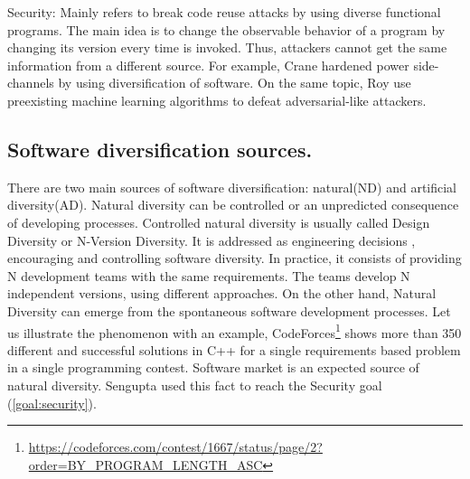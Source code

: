 \begin{goal}{Security:}
    \label{goal:security}    
    \normalfont
    Mainly refers to break code reuse attacks \cite{595185} by using diverse functional programs. The main idea is to change the observable behavior of a program by changing its version every time is invoked. Thus, attackers cannot get the same information from a different source. For example, Crane \etal \cite{crane2015thwarting} hardened power side-channels by using diversification of software. On the same topic, Roy \etal \cite{10.1145/3318216.3363338} use preexisting machine learning algorithms to defeat adversarial-like attackers.
\end{goal} 







\subsection*{Software diversification sources.}

There are two main sources of software diversification: natural(ND) and artificial diversity(AD). Natural diversity can be controlled or an unpredicted consequence of developing processes. Controlled natural diversity is usually called Design Diversity or N-Version Diversity. It is addressed as engineering decisions \cite{1659219}, encouraging and controlling software diversity. In practice, it consists of providing N development teams with the same requirements. The teams develop N independent versions, using different approaches. On the other hand, Natural Diversity can emerge from the spontaneous software development processes. Let us illustrate the phenomenon with an example, CodeForces\footnote{\url{https://codeforces.com/contest/1667/status/page/2?order=BY_PROGRAM_LENGTH_ASC}} shows more than 350 different and successful solutions in C++ for a single requirements based problem in a single programming contest. 
Software market is an expected source of natural diversity. Sengupta \etal \cite{10.5555/3091125.3091155} used this fact to reach the Security goal (\autoref{goal:security}).


